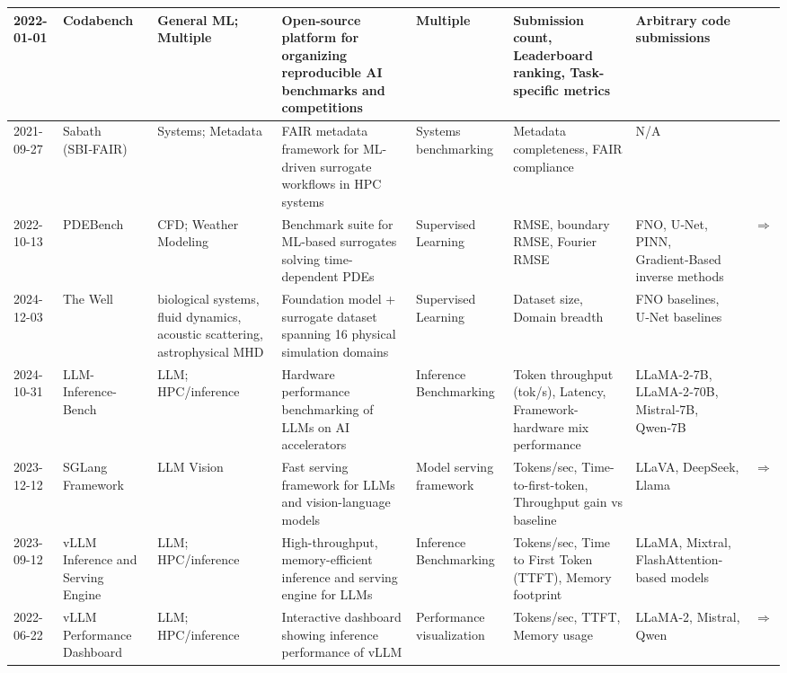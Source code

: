 \documentclass{article}
\begin{document}
\begin{landscape}
{\begin{longtable}{|p{1.5cm}|p{2.5cm}|p{2cm}|p{2cm}|p{3cm}|p{2cm}|p{2cm}|p{1cm}|}
2022-01-01 & Codabench & General ML; Multiple & Open-source platform for organizing reproducible AI benchmarks and competitions & Multiple & Submission count, Leaderboard ranking, Task-specific metrics & Arbitrary code submissions & \cite{xu2021codabench} \\ \hline
2021-09-27 & Sabath (SBI‑FAIR) & Systems; Metadata & FAIR metadata framework for ML-driven surrogate workflows in HPC systems & Systems benchmarking & Metadata completeness, FAIR compliance & N/A & \cite{luszczek2021sabath} \\ \hline
2022-10-13 & PDEBench & CFD; Weather Modeling & Benchmark suite for ML-based surrogates solving time-dependent PDEs & Supervised Learning & RMSE, boundary RMSE, Fourier RMSE & FNO, U‑Net, PINN, Gradient‑Based inverse methods & \cite{takamoto2022pdebench} \href{https://arxiv.org/abs/2210.07182}{$\Rightarrow$ } \\ \hline
2024-12-03 & The Well & biological systems, fluid dynamics, acoustic scattering, astrophysical MHD & Foundation model + surrogate dataset spanning 16 physical simulation domains & Supervised Learning & Dataset size, Domain breadth & FNO baselines, U‑Net baselines & \cite{ohana2024well} \\ \hline
2024-10-31 & LLM-Inference-Bench & LLM; HPC/inference & Hardware performance benchmarking of LLMs on AI accelerators & Inference Benchmarking & Token throughput (tok/s), Latency, Framework-hardware mix performance & LLaMA-2‑7B, LLaMA-2‑70B, Mistral‑7B, Qwen‑7B & \cite{chitty2024llm} \\ \hline
2023-12-12 & SGLang Framework & LLM Vision & Fast serving framework for LLMs and vision-language models & Model serving framework & Tokens/sec, Time-to-first-token, Throughput gain vs baseline & LLaVA, DeepSeek, Llama & \cite{zheng2023sglang} \href{https://arxiv.org/abs/2312.07104}{$\Rightarrow$ } \\ \hline
2023-09-12 & vLLM Inference and Serving Engine & LLM; HPC/inference & High-throughput, memory-efficient inference and serving engine for LLMs & Inference Benchmarking & Tokens/sec, Time to First Token (TTFT), Memory footprint & LLaMA, Mixtral, FlashAttention-based models & \cite{kwon2023efficient} \\ \hline
2022-06-22 & vLLM Performance Dashboard & LLM; HPC/inference & Interactive dashboard showing inference performance of vLLM & Performance visualization & Tokens/sec, TTFT, Memory usage & LLaMA-2, Mistral, Qwen & \cite{mo2024vllm_dashboard} \href{https://simon-mo-workspace.observablehq.cloud/vllm-dashboard-v0/}{$\Rightarrow$ } \\ \hline

\end{longtable}}
\end{landscape}
\end{document}
